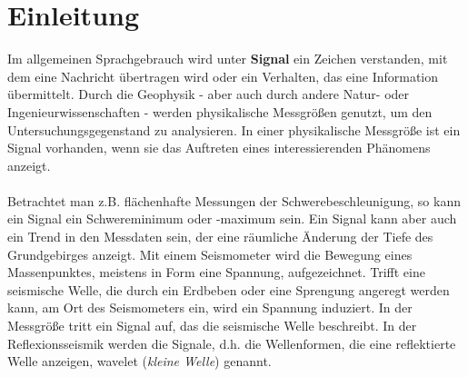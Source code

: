 \chapter{Einleitung}

Im allgemeinen Sprachgebrauch wird unter {\bf Signal} ein Zeichen verstanden, mit dem eine Nachricht übertragen wird oder ein Verhalten, das eine Information übermittelt. Durch die Geophysik - aber auch durch andere Natur- oder Ingenieurwissenschaften - werden physikalische Messgrößen genutzt, um den Untersuchungsgegenstand zu analysieren. In einer physikalische Messgröße ist ein Signal vorhanden, wenn sie das Auftreten eines interessierenden Phänomens anzeigt.\\\\
Betrachtet man z.B. flächenhafte Messungen der Schwerebeschleunigung, so kann ein Signal ein Schwereminimum oder -maximum sein. Ein Signal kann aber auch ein Trend in den Messdaten sein, der eine räumliche Änderung der Tiefe des Grundgebirges anzeigt. Mit einem Seismometer wird die  Bewegung eines Massenpunktes, meistens in Form eine Spannung, aufgezeichnet. Trifft eine seismische Welle, die durch ein Erdbeben oder eine Sprengung angeregt werden kann, am Ort des Seismometers ein, wird ein Spannung induziert. In der Messgröße tritt ein Signal auf, das die seismische Welle beschreibt. In der Reflexionsseismik werden die Signale, d.h. die Wellenformen, die eine reflektierte Welle anzeigen, wavelet (\textsl{kleine Welle}) genannt.\\

